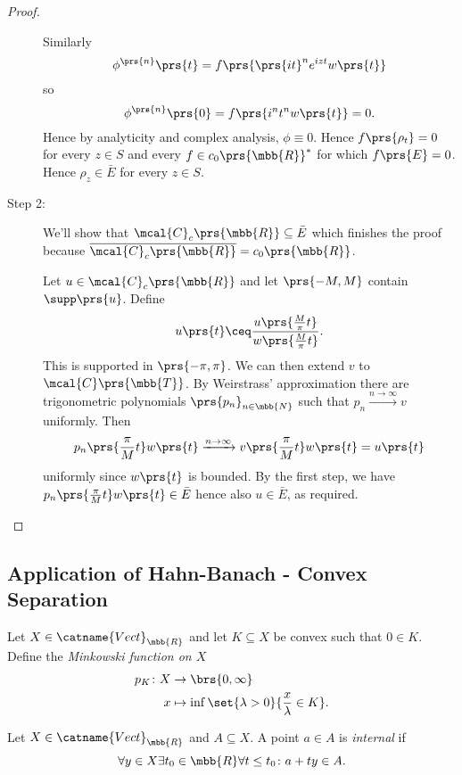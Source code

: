 \documentclass[10pt, twoside]{book}
\begin{document}
\begin{proof}
\begin{description}
Similarly 
\[\phi^{\prs{n}}\prs{t} = f\prs{\prs{it}^n e^{izt} w\prs{t}}\]
so
\[\phi^{\prs{n}}\prs{0} = f\prs{i^n t^n w\prs{t}} = 0 \text{.}\]
Hence by analyticity and complex analysis, $\phi \equiv 0$. Hence $f\prs{\rho_t} = 0$ for every $z \in S$ and every $f \in c_0\prs{\mbb{R}}^*$ for which $f\prs{E} = 0$.
Hence $\rho_z \in \bar{E}$ for every $z \in S$.

\item[Step 2:]
We'll show that $\mcal{C}_c\prs{\mbb{R}} \subseteq \bar{E}$ which finishes the proof because $\overline{\mcal{C}_c\prs{\mbb{R}}} = c_0\prs{\mbb{R}}$.

Let $u \in \mcal{C}_c\prs{\mbb{R}}$ and let $\prs{-M, M}$ contain $\supp\prs{u}$. Define
\[u\prs{t} \ceq \frac{u\prs{\frac{M}{\pi} t}}{w\prs{\frac{M}{\pi} t}} \text{.}\]
This is supported in $\prs{-\pi, \pi}$.
We can then extend $v$ to $\mcal{C}\prs{\mbb{T}}$. By Weirstrass' approximation there are trigonometric polynomials $\prs{p_n}_{n \in \mbb{N}}$ such that $p_n \xrightarrow{n\to\infty} v$ uniformly.
Then
\[p_n\prs{\frac{\pi}{M} t} w\prs{t} \xrightarrow{n\to\infty} v\prs{\frac{\pi}{M} t} w\prs{t} = u\prs{t}\]
uniformly since $w\prs{t}$ is bounded.
By the first step, we have $p_n\prs{\frac{\pi}{M} t} w\prs{t} \in \bar{E}$ hence also $u \in \bar{E}$, as required.
\end{description}
\end{proof}

\subsection{Application of Hahn-Banach - Convex Separation}

\begin{definition}
Let $X \in \catname{Vect}_{\mbb{R}}$ and let $K \subseteq X$ be convex such that $0 \in K$.
Define the \emph{Minkowski function on $X$}
\begin{align*}
p_K \colon X &\to \brs{0, \infty} \\
x &\mapsto \inf\set{\lambda > 0}{\frac{x}{\lambda} \in K} \text{.}
\end{align*}
\end{definition}

\begin{definition}
Let $X \in \catname{Vect}_{\mbb{R}}$ and $A \subseteq X$. A point $a \in A$ is \emph{internal} if
\[\forall y \in X \exists t_0 \in \mbb{R} \forall t \leq t_0 \colon a + ty \in A \text{.}\]
\end{definition}
\end{document}

